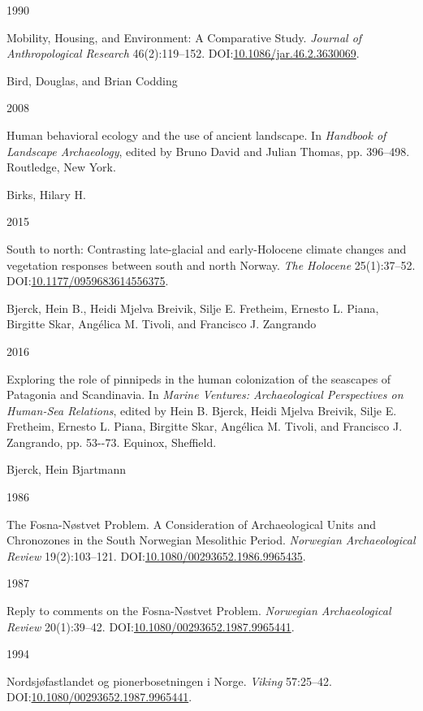 \documentclass[
  12pt,
  a4paper,
  oneside]{book}
\newlength{\cslhangindent}
\newlength{\csllabelwidth}
\newlength{\cslentryspacingunit} %
\newenvironment{CSLReferences}[2] %
 {%
  \setlength{\parindent}{0pt}
  \ifodd #1
  \let\oldpar\par
  \def\par{\hangindent=\cslhangindent\oldpar}
  \fi
  \setlength{\parskip}{#2\cslentryspacingunit}
 }%
 {}
\newcommand{\CSLBlock}[1]{#1\hfill\break}
\newcommand{\CSLLeftMargin}[1]{\parbox[t]{\csllabelwidth}{#1}}
\newcommand{\CSLRightInline}[1]{\parbox[t]{\linewidth - \csllabelwidth}{#1}\break}
\begin{document}
\begin{CSLReferences}{0}{0}
\leavevmode{}%
\CSLLeftMargin{ 1990 }%
\CSLRightInline{Mobility, Housing, and Environment: A Comparative Study. \emph{Journal of Anthropological Research} 46(2):119--152. DOI:\href{https://doi.org/10.1086/jar.46.2.3630069}{10.1086/jar.46.2.3630069}.}

\leavevmode{}%
\CSLBlock{Bird, Douglas, and Brian Codding}
\CSLLeftMargin{ 2008}%
\CSLRightInline{{Human behavioral ecology and the use of ancient landscape}. In \emph{{Handbook of Landscape Archaeology}}, edited by Bruno David and Julian Thomas, pp. 396--498. Routledge, New York.}

\leavevmode{}%
\CSLBlock{Birks, Hilary H.}
\CSLLeftMargin{ 2015}%
\CSLRightInline{{South to north: Contrasting late-glacial and early-Holocene climate changes and vegetation responses between south and north Norway}. \emph{The Holocene} 25(1):37--52. DOI:\href{https://doi.org/10.1177/0959683614556375}{10.1177/0959683614556375}.}

\leavevmode{}%
\CSLBlock{Bjerck, Hein B., Heidi Mjelva Breivik, Silje E. Fretheim, Ernesto L. Piana, Birgitte Skar, Angélica M. Tivoli, and Francisco J. Zangrando}
\CSLLeftMargin{ 2016}%
\CSLRightInline{{Exploring the role of pinnipeds in the human colonization of the seascapes of Patagonia and Scandinavia}. In \emph{{Marine Ventures: Archaeological Perspectives on Human-Sea Relations}}, edited by Hein B. Bjerck, Heidi Mjelva Breivik, Silje E. Fretheim, Ernesto L. Piana, Birgitte Skar, Angélica M. Tivoli, and Francisco J. Zangrando, pp. 53-\/-73. Equinox, Sheffield.}

\leavevmode{}%
\CSLBlock{Bjerck, Hein Bjartmann}
\CSLLeftMargin{ 1986}%
\CSLRightInline{{The Fosna-Nøstvet Problem. A Consideration of Archaeological Units and Chronozones in the South Norwegian Mesolithic Period}. \emph{Norwegian Archaeological Review} 19(2):103--121. DOI:\href{https://doi.org/10.1080/00293652.1986.9965435}{10.1080/00293652.1986.9965435}.}

\leavevmode{}%
\CSLLeftMargin{ 1987 }%
\CSLRightInline{{Reply to comments on the Fosna-Nøstvet Problem}. \emph{Norwegian Archaeological Review} 20(1):39--42. DOI:\href{https://doi.org/10.1080/00293652.1987.9965441}{10.1080/00293652.1987.9965441}.}

\leavevmode{}%
\CSLLeftMargin{ 1994 }%
\CSLRightInline{{Nordsjøfastlandet og pionerbosetningen i Norge}. \emph{Viking} 57:25--42. DOI:\href{https://doi.org/10.1080/00293652.1987.9965441}{10.1080/00293652.1987.9965441}.}


\end{CSLReferences}
\end{document}
